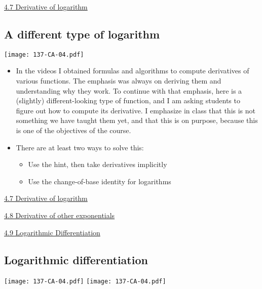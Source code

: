 \documentclass[11pt]{article}
\newcommand{\nl}{\hfill \vspace{-1.1\baselineskip}} %
\newcommand{\vvii}{\hspace{8mm} \href{https://www.youtube.com/watch?v=Nx7noVPMkXE&list=PLlwePzQY_wW-EDeUZebRoA8HGoeZxxpEU&index=7}{4.7 Derivative of logarithm}}
\newcommand{\vviii}{\hspace{8mm} \href{https://www.youtube.com/watch?v=GLc0JgegIH4&list=PLlwePzQY_wW-EDeUZebRoA8HGoeZxxpEU&index=8}{4.8 Derivative of other exponentials}}
\newcommand{\vix}{\hspace{8mm} \href{https://www.youtube.com/watch?v=0iF8AUWVrb0&list=PLlwePzQY_wW-EDeUZebRoA8HGoeZxxpEU&index=9}{4.9 Logarithmic Differentiation}}
\begin{document}
\begin{videos}
\vvii
\end{videos}

\newpage
\subsection{A different type of logarithm} 

\begin{center}
{ \texttt{[image: 137-CA-04.pdf]}} 
\end{center}


\begin{comments}
\nl
\begin{itemize}
	\item In the videos I obtained formulas and algorithms to compute derivatives of various functions.  The emphasis was always on deriving them and understanding why they work.    To continue with that emphasis, here is a (slightly) different-looking type of function, and I am asking students to figure out how to compute its derivative.  I emphasize in class that this is not something we have taught them yet, and that this is on purpose, because this is one of the objectives of the course.
	\item There are at least two ways to solve this:
		\begin{itemize}
			\item  Use the hint, then take derivatives implicitly
			\item  Use the change-of-base identity for logarithms
		\end{itemize}	
\end{itemize}	
\end{comments}

\begin{videos}
\vvii

\vviii

\vix
\end{videos}

\newpage
\subsection{Logarithmic differentiation} 

\begin{center}
{ \texttt{[image: 137-CA-04.pdf]}} \quad
{ \texttt{[image: 137-CA-04.pdf]}} 
\end{center}
\end{document}
